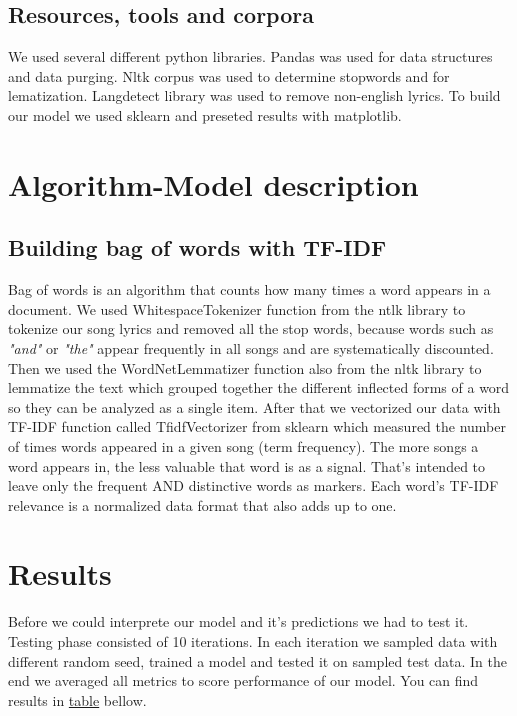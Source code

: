 \documentclass[a4paper,11pt]{article}
\begin{document}
\subsection{Resources, tools and corpora}

We used several different python libraries. Pandas was used for data structures and data purging. Nltk corpus was used to determine stopwords and for lematization. Langdetect library was used to remove non-english lyrics. To build our model we used sklearn and preseted results with matplotlib.

\section{Algorithm-Model description}


\subsection{Building bag of words with TF-IDF}
Bag of words is an algorithm that counts how many times a word appears in a document. We used WhitespaceTokenizer function from the ntlk library to tokenize our song lyrics and removed all the stop words, because words such as \textit{"and"} or \textit{"the"} appear frequently in all songs and are systematically discounted. Then we used the WordNetLemmatizer function also from the nltk library to lemmatize the text which grouped together the different inflected forms of a word so they can be analyzed as a single item. After that we vectorized our data with TF-IDF function called TfidfVectorizer from sklearn which measured the number of times words appeared in a given song (term frequency). The more songs a word appears in, the less valuable that word is as a signal. That’s intended to leave only the frequent AND distinctive words as markers. Each word’s TF-IDF relevance is a normalized data format that also adds up to one.

\pagebreak
\section{Results}

Before we could interprete our model and it's predictions we had to test it. Testing phase consisted of 10 iterations. In each iteration we sampled data with different random seed, trained a model and tested it on sampled test data. In the end we averaged all metrics to score performance of our model. You can find results in \hyperref[label-model-score]{table} bellow.
\end{document}
